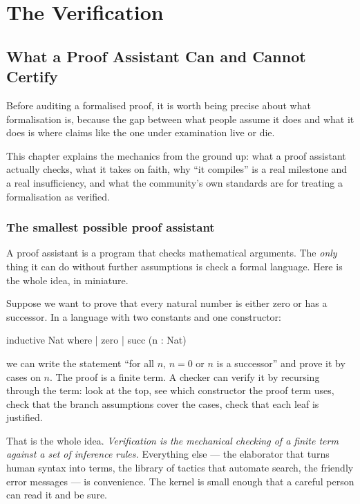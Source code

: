 
\part{The Verification}
\label{part:verify}

\chapter{What a Proof Assistant Can and Cannot Certify}
\label{ch:lean}

Before auditing a formalised proof, it is worth being precise about what
formalisation is, because the gap between what people assume it does and what
it does is where claims like the one under examination live or die.

This chapter explains the mechanics from the ground up: what a proof assistant
actually checks, what it takes on faith, why ``it compiles'' is a real
milestone and a real insufficiency, and what the community's own standards are
for treating a formalisation as verified.

\section{The smallest possible proof assistant}A proof assistant is a program that checks mathematical arguments. The
\emph{only} thing it can do without further assumptions is check a formal
language. Here is the whole idea, in miniature.

Suppose we want to prove that every natural number is either zero or has a
successor. In a language with two constants and one constructor:

\begin{leanquote}
inductive Nat where
  | zero
  | succ (n : Nat)
\end{leanquote}

we can write the statement ``for all $n$, $n = 0$ or $n$ is a successor'' and
prove it by cases on $n$. The proof is a finite term. A checker can verify it by
recursing through the term: look at the top, see which constructor the proof
term uses, check that the branch assumptions cover the cases, check that each
leaf is justified.

That is the whole idea. \emph{Verification is the mechanical checking of a
finite term against a set of inference rules.} Everything else --- the
elaborator that turns human syntax into terms, the library of tactics that
automate search, the friendly error messages --- is convenience. The kernel is
small enough that a careful person can read it and be sure.

